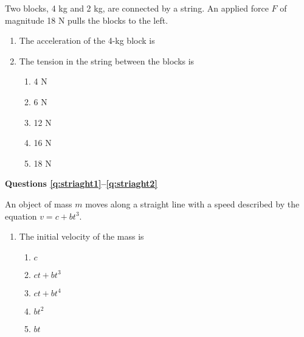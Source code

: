 \documentclass{../../../oss-classkick}
\begin{document}
\begin{multicols*}{2}
  Two blocks, 4 kg and 2 kg, are connected by a string. An applied force $F$ of
  magnitude 18 N pulls the blocks to the left.
  \begin{center}
  \end{center}
  \begin{enumerate}[resume,leftmargin=18pt]    
  \item The acceleration of the 4-kg block is
    \label{q:2blocks1}
    
  \item The tension in the string between the blocks is
    \begin{enumerate}[noitemsep,topsep=0pt,leftmargin=18pt,label=(\Alph*)]
    \item 4 N
    \item 6 N
    \item 12 N
    \item 16 N
    \item 18 N
    \end{enumerate}
    \label{q:2blocks2}
  \end{enumerate}

  \textbf{Questions \ref{q:striaght1}--\ref{q:striaght2}}

  An object of mass $m$ moves along a straight line with a speed described by
  the equation $v=c+bt^3$.
  \begin{enumerate}[resume,leftmargin=18pt]
  \item The initial velocity of the mass is
    \begin{enumerate}[nosep,leftmargin=18pt,label=(\Alph*)]
    \item $c$
    \item $ct+bt^3$
    \item $ct+bt^4$
    \item $bt^2$
    \item $bt$
    \end{enumerate}
    \label{q:striaght1}


\end{enumerate}
\end{multicols*}
\end{document}
